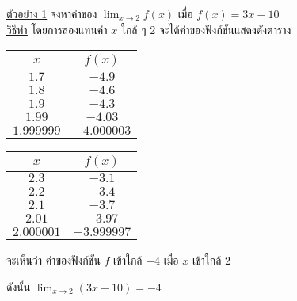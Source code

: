 \documentclass[hidelinks,12pt,a4paper]{article}
\newcommand{\qed}{\scalebox{0.8}{$\blacksquare$}}
\begin{document}
\vspace{5mm}
\underline{ตัวอย่าง 1} จงหาค่าของ $\displaystyle\lim_{x\to 2} f(x)$ เมื่อ $f(x)=3x-10$ \\[1ex]
\underline{\underline{วิธีทำ}}\hspace{8mm} โดยการลองแทนค่า $x$ ใกล้ ๆ $2$ จะได้ค่าของฟังก์ชันแสดงดังตาราง
\begin{center}
\begin{tabular}{|c|c|}
    \hline
    \rowcolor{pink} 
    $x$ & $f(x)$ \\
    \hline
    $1.7$ & $-4.9$ \\
    \hline
    $1.8$ & $-4.6$ \\
    \hline
    $1.9$ & $-4.3$ \\
    \hline
    $1.99$ & $-4.03$ \\ 
    \hline
    $1.999999$ & $-4.000003$ \\
    \hline
\end{tabular}
\hspace{1cm}
\begin{tabular}{|c|c|}
    \hline
    \rowcolor{pink} 
    $x$ & $f(x)$ \\
    \hline
    $2.3$ & $-3.1$ \\
    \hline
    $2.2$ & $-3.4$ \\
    \hline
    $2.1$ & $-3.7$ \\
    \hline
    $2.01$ & $-3.97$ \\
    \hline
    $2.000001$ & $-3.999997$ \\
    \hline
\end{tabular}
\end{center}
\hspace{15mm} จะเห็นว่า ค่าของฟังก์ชัน $f$ เข้าใกล้ $-4$ เมื่อ $x$ เข้าใกล้ $2$ 

\hspace{15mm} ดังนั้น $\displaystyle\lim_{x\to 2} (3x-10) = -4$ \hfill \qed
\end{document}
